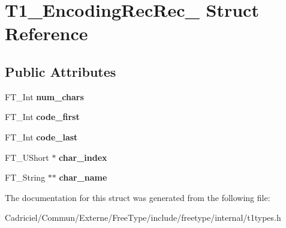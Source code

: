 \hypertarget{struct_t1___encoding_rec_rec__}{\section{T1\-\_\-\-Encoding\-Rec\-Rec\-\_\- Struct Reference}
\label{struct_t1___encoding_rec_rec__}
}
\subsection*{Public Attributes}
\begin{DoxyCompactItemize}
\item 
\hypertarget{struct_t1___encoding_rec_rec___af1468d5bad99cccebeb0387713999e9c}{F\-T\-\_\-\-Int {\bfseries num\-\_\-chars}}\label{struct_t1___encoding_rec_rec___af1468d5bad99cccebeb0387713999e9c}

\item 
\hypertarget{struct_t1___encoding_rec_rec___ae21aad8cbb10c8fd94e9f30c60542662}{F\-T\-\_\-\-Int {\bfseries code\-\_\-first}}\label{struct_t1___encoding_rec_rec___ae21aad8cbb10c8fd94e9f30c60542662}

\item 
\hypertarget{struct_t1___encoding_rec_rec___a9be1faadf0ce11d12d3bce600e1f2a9d}{F\-T\-\_\-\-Int {\bfseries code\-\_\-last}}\label{struct_t1___encoding_rec_rec___a9be1faadf0ce11d12d3bce600e1f2a9d}

\item 
\hypertarget{struct_t1___encoding_rec_rec___a0c00a7b5c5ec7ba5eba667252f11f199}{F\-T\-\_\-\-U\-Short $\ast$ {\bfseries char\-\_\-index}}\label{struct_t1___encoding_rec_rec___a0c00a7b5c5ec7ba5eba667252f11f199}

\item 
\hypertarget{struct_t1___encoding_rec_rec___acf21f77cff90336fb9f297799aaf26eb}{F\-T\-\_\-\-String $\ast$$\ast$ {\bfseries char\-\_\-name}}\label{struct_t1___encoding_rec_rec___acf21f77cff90336fb9f297799aaf26eb}

\end{DoxyCompactItemize}


The documentation for this struct was generated from the following file\-:\begin{DoxyCompactItemize}
\item 
Cadriciel/\-Commun/\-Externe/\-Free\-Type/include/freetype/internal/t1types.\-h\end{DoxyCompactItemize}
